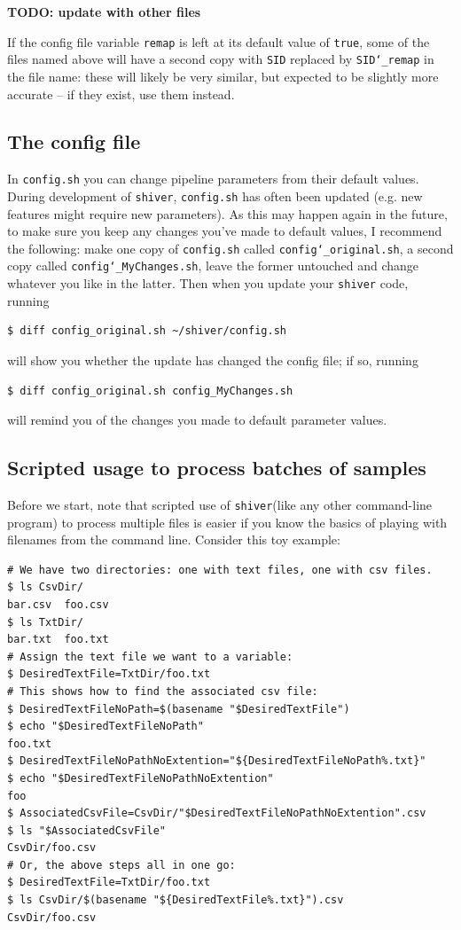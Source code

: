 \documentclass{article}
\newcommand{\shiv}{\texttt{shiver}\xspace}
\let\c\texttt
\begin{document}
{\bf TODO: update with other files}

If the config file variable \c{remap} is left at its default value of \c{true}, some of the files named above will have a second copy with \c{SID} replaced by \c{SID\char`_remap} in the file name: these will likely be very similar, but expected to be slightly more accurate -- if they exist, use them instead.

\subsection*{The config file}
In \c{config.sh} you can change pipeline parameters from their default values.
During development of \shiv, \c{config.sh} has often been updated (e.g. new features might require new parameters).
As this may happen again in the future, to make sure you keep any changes you've made to default values, I recommend the following: make one copy of \c{config.sh} called \c{config\char`_original.sh}, a second copy called \c{config\char`_MyChanges.sh}, leave the former untouched and change whatever you like in the latter.
Then when you update your \shiv code, running
\begin{Verbatim}[samepage=true]
$ diff config_original.sh ~/shiver/config.sh
\end{Verbatim}
will show you whether the update has changed the config file; if so, running
\begin{Verbatim}[samepage=true]
$ diff config_original.sh config_MyChanges.sh
\end{Verbatim}
will remind you of the changes you made to default parameter values.


\subsection*{Scripted usage to process batches of samples}
Before we start, note that scripted use of \shiv (like any other command-line program) to process multiple files is easier if you know the basics of playing with filenames from the command line.
Consider this toy example:
\begin{Verbatim}[samepage=true]
# We have two directories: one with text files, one with csv files.
$ ls CsvDir/
bar.csv  foo.csv
$ ls TxtDir/
bar.txt  foo.txt
# Assign the text file we want to a variable:
$ DesiredTextFile=TxtDir/foo.txt
# This shows how to find the associated csv file:
$ DesiredTextFileNoPath=$(basename "$DesiredTextFile")
$ echo "$DesiredTextFileNoPath"
foo.txt
$ DesiredTextFileNoPathNoExtention="${DesiredTextFileNoPath%.txt}"
$ echo "$DesiredTextFileNoPathNoExtention"
foo
$ AssociatedCsvFile=CsvDir/"$DesiredTextFileNoPathNoExtention".csv
$ ls "$AssociatedCsvFile"
CsvDir/foo.csv
# Or, the above steps all in one go:
$ DesiredTextFile=TxtDir/foo.txt
$ ls CsvDir/$(basename "${DesiredTextFile%.txt}").csv
CsvDir/foo.csv
\end{Verbatim}
\end{document}
